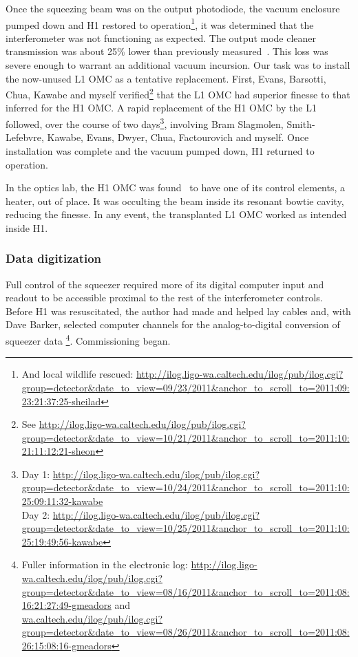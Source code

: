 Once the squeezing beam was on the output photodiode, the vacuum enclosure pumped down and H1 restored to operation\footnote{And local wildlife rescued: \url{http://ilog.ligo-wa.caltech.edu/ilog/pub/ilog.cgi?group=detector&date_to_view=09/23/2011&anchor_to_scroll_to=2011:09:23:21:37:25-sheilad}}, 
it was determined that the interferometer was not functioning as expected.
The output mode cleaner transmission was about 25\% lower than previously measured~\cite{Waldman2011,SmithThesis}.
This loss was severe enough to warrant an additional vacuum incursion.
Our task was to install the now-unused L1 OMC as a tentative replacement. 
First, Evans, Barsotti, Chua, Kawabe and myself verified\footnote{See \url{http://ilog.ligo-wa.caltech.edu/ilog/pub/ilog.cgi?group=detector&date_to_view=10/21/2011&anchor_to_scroll_to=2011:10:21:11:12:21-sheon}} that the L1 OMC had superior finesse to that inferred for the H1 OMC.
A rapid replacement of the H1 OMC by the L1 followed, over the course of two days\footnote{Day 1: \url{http://ilog.ligo-wa.caltech.edu/ilog/pub/ilog.cgi?group=detector&date_to_view=10/24/2011&anchor_to_scroll_to=2011:10:25:09:11:32-kawabe} \\ Day 2: \url{http://ilog.ligo-wa.caltech.edu/ilog/pub/ilog.cgi?group=detector&date_to_view=10/25/2011&anchor_to_scroll_to=2011:10:25:19:49:56-kawabe}},
involving Bram Slagmolen, Smith-Lefebvre, Kawabe, Evans, Dwyer, Chua, Factourovich and myself.
Once installation was complete and the vacuum pumped down, H1 returned to operation.

In the optics lab, the H1 OMC was found~\cite{Waldman2011} to have one of its control elements, a heater, out of place. 
It was occulting the beam inside its resonant bowtie cavity, reducing the finesse.
In any event, the transplanted L1 OMC worked as intended inside H1.


            \subsubsection{Data digitization}
            \label{data_digitization}

Full control of the squeezer required more of its digital computer input and readout to be accessible proximal to the rest of the interferometer controls.
Before H1 was resuscitated, the author had made and helped lay cables and, with Dave Barker, selected computer channels for the analog-to-digital conversion of squeezer data \footnote{Fuller information in the electronic log: \url{http://ilog.ligo-wa.caltech.edu/ilog/pub/ilog.cgi?group=detector&date_to_view=08/16/2011&anchor_to_scroll_to=2011:08:16:21:27:49-gmeadors} and \\ \url{wa.caltech.edu/ilog/pub/ilog.cgi?group=detector&date_to_view=08/26/2011&anchor_to_scroll_to=2011:08:26:15:08:16-gmeadors}}.
Commissioning began.

